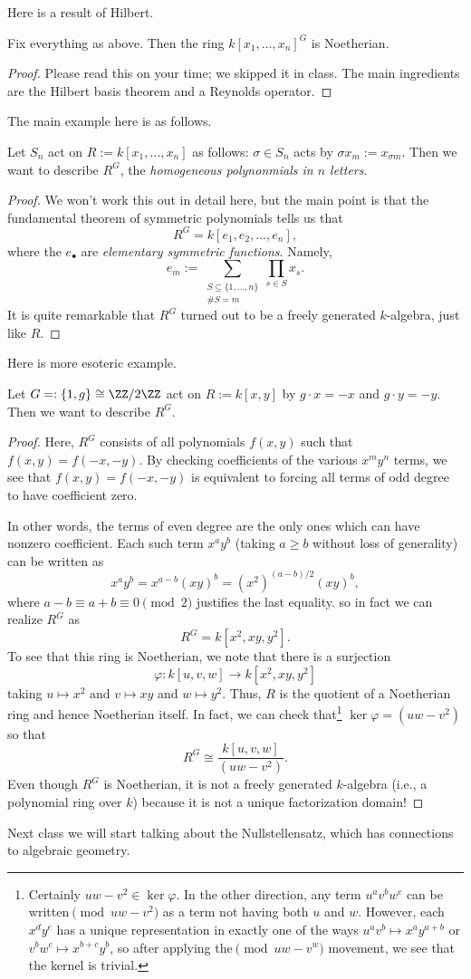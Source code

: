 Here is a result of Hilbert.
\begin{theorem}[Hilbert]
	Fix everything as above. Then the ring $k[x_1,\ldots,x_n]^G$ is Noetherian.
\end{theorem}
\begin{proof}
	Please read this on your time; we skipped it in class. The main ingredients are the Hilbert basis theorem and a Reynolds operator.
\end{proof}
The main example here is as follows.
\begin{exe}
	Let $S_n$ act on $R:=k[x_1,\ldots,x_n]$ as follows: $\sigma\in S_n$ acts by $\sigma x_m:=x_{\sigma m}$. Then we want to describe $R^G$, the \textit{homogeneous polynonmials in $n$ letters}.
\end{exe}
\begin{proof}
	We won't work this out in detail here, but the main point is that the fundamental theorem of symmetric polynomials tells us that
	\[R^G=k[e_1,e_2,\ldots,e_n],\]
	where the $e_\bullet$ are \textit{elementary symmetric functions}. Namely,
	\[e_m:=\sum_{\substack{S\subseteq\{1,\ldots,n\}\\\#S=m}}\prod_{s\in S}x_s.\]
	It is quite remarkable that $R^G$ turned out to be a freely generated $k$-algebra, just like $R$.
\end{proof}
Here is more esoteric example.
\begin{exe}
	Let $G=:\{1,g\}\cong\ZZ/2\ZZ$ act on $R:=k[x,y]$ by $g\cdot x=-x$ and $g\cdot y=-y$. Then we want to describe $R^G$.
\end{exe}
\begin{proof}
	Here, $R^G$ consists of all polynomials $f(x,y)$ such that $f(x,y)=f(-x,-y)$. By checking coefficients of the various $x^my^n$ terms, we see that $f(x,y)=f(-x,-y)$ is equivalent to forcing all terms of odd degree to have coefficient zero.
	
	In other words, the terms of even degree are the only ones which can have nonzero coefficient. Each such term $x^ay^b$ (taking $a\ge b$ without loss of generality) can be written as
	\[x^ay^b=x^{a-b}(xy)^b=\left(x^2\right)^{(a-b)/2}(xy)^b,\]
	where $a-b\equiv a+b\equiv0\pmod2$ justifies the last equality. so in fact we can realize $R^G$ as
	\[R^G=k\left[x^2,xy,y^2\right].\]
	To see that this ring is Noetherian, we note that there is a surjection
	\[\varphi:k[u,v,w]\to k\left[x^2,xy,y^2\right]\]
	taking $u\mapsto x^2$ and $v\mapsto xy$ and $w\mapsto y^2$. Thus, $R$ is the quotient of a Noetherian ring and hence Noetherian itself. In fact, we can check that\footnote{Certainly $uw-v^2\in\ker\varphi$. In the other direction, any term $u^av^bw^c$ can be written$\pmod{uw-v^2}$ as a term not having both $u$ and $w$. However, each $x^dy^e$ has a unique representation in exactly one of the ways $u^av^b\mapsto x^ay^{a+b}$ or $v^bw^c\mapsto x^{b+c}y^b$, so after applying the$\pmod{uw-v^w}$ movement, we see that the kernel is trivial.} $\ker\varphi=\left(uw-v^2\right)$ so that
	\[R^G\cong\frac{k[u,v,w]}{\left(uw-v^2\right)}.\]
	Even though $R^G$ is Noetherian, it is not a freely generated $k$-algebra (i.e., a polynomial ring over $k$) because it is not a unique factorization domain!
\end{proof}
Next class we will start talking about the Nullstellensatz, which has connections to algebraic geometry.